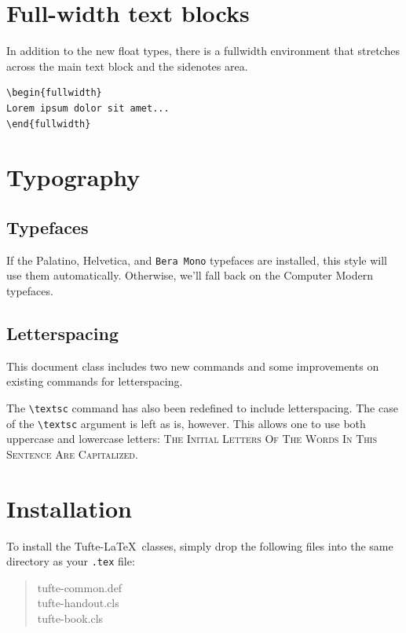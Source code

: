 \documentclass{tufte-handout}
\newcommand{\docenv}[1]{\textsf{#1}}%
\begin{document}
\section{Full-width text blocks}

In addition to the new float types, there is a \docenv{fullwidth}
environment that stretches across the main text block and the sidenotes
area.

\begin{Verbatim}
\begin{fullwidth}
Lorem ipsum dolor sit amet...
\end{fullwidth}
\end{Verbatim}

\begin{fullwidth}
\small\itshape\lipsum[1]
\end{fullwidth}

\section{Typography}\label{sec:typography}

\subsection{Typefaces}\label{sec:typefaces}
If the Palatino, \textsf{Helvetica}, and \texttt{Bera Mono} typefaces are installed, this style
will use them automatically.  Otherwise, we'll fall back on the Computer Modern
typefaces.

\subsection{Letterspacing}\label{sec:letterspacing}
This document class includes two new commands and some improvements on
existing commands for letterspacing.

The \Verb|\textsc| command has also been redefined to include
letterspacing.  The case of the \Verb|\textsc| argument is left as is,
however.  This allows one to use both uppercase and lowercase letters:
\textsc{The Initial Letters Of The Words In This Sentence Are Capitalized.}

\section{Installation}\label{sec:installation}
To install the Tufte-\LaTeX\ classes, simply drop the
following files into the same directory as your \texttt{.tex}
file:
\begin{quote}
  \ttfamily
  tufte-common.def\\
  tufte-handout.cls\\
  tufte-book.cls
\end{quote}
\end{document}
